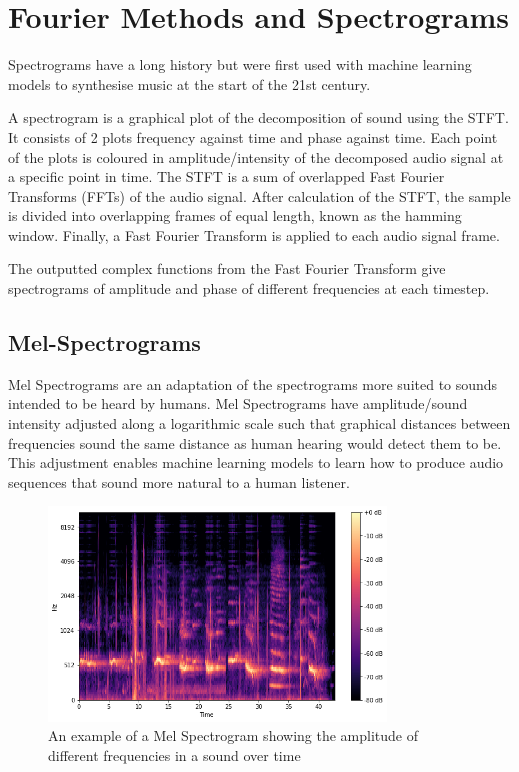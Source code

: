 \section{Fourier Methods and Spectrograms}
\label{sec:fourier_methods_and_spectrograms}

Spectrograms have a long history but were first used with machine learning models to synthesise music at the start of the 21st century\cite{NoteOnsetDetection}.

A spectrogram is a graphical plot of the decomposition of sound using the \acrfull{STFT}. It consists of 2 plots frequency against time and phase against time. Each point of the plots is coloured in amplitude/intensity of the decomposed audio signal at a specific point in time. The STFT is a sum of overlapped Fast Fourier Transforms (FFTs) of the audio signal. After calculation of the STFT, the sample is divided into overlapping frames of equal length, known as the hamming window. Finally, a Fast Fourier Transform is applied to each audio signal frame. 

The outputted complex functions from the Fast Fourier Transform give spectrograms of amplitude and phase of different frequencies at each timestep.

\subsection{Mel-Spectrograms}

Mel Spectrograms are an adaptation of the spectrograms more suited to sounds intended to be heard by humans. Mel Spectrograms have amplitude/sound intensity adjusted along a logarithmic scale such that graphical distances between frequencies sound the same distance as human hearing would detect them to be. This adjustment enables machine learning models to learn how to produce audio sequences that sound more natural to a human listener.

\begin{figure}[H]
    \centering
    \includegraphics[width=0.8\textwidth]{literature_review/MelSpectrogram.png}
    \caption{An example of a  Mel Spectrogram showing the amplitude of different frequencies in a sound over time\cite{GettingToKnowTheMelSpectrogram}}
    \label{fig:spectrograms}
\end{figure}


